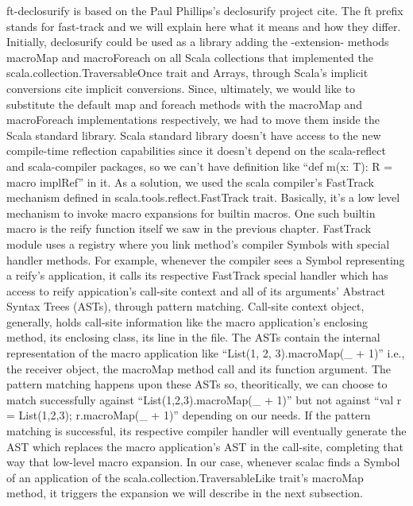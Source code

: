 ft-declosurify is based on the  Paul Phillips's declosurify project {cite}. The
ft prefix stands for fast-track and we will explain here what it
means and how they differ. Initially, declosurify could be used as a library
adding the -extension- methods macroMap and macroForeach on all Scala
collections that implemented the scala.collection.TraversableOnce trait and
Arrays, through Scala's implicit conversions {cite implicit conversions}. Since,
ultimately, we would like to substitute the default map and foreach methods
with the macroMap and macroForeach implementations respectively, we had to move
them inside the Scala standard library. Scala standard library
doesn't have access to the new compile-time reflection capabilities since it
doesn't depend on the
scala-reflect and scala-compiler packages, so we can't have definition like
``def m(x: T): R = macro implRef'' in it. As a solution, we
used the scala compiler's FastTrack mechanism defined in
scala.tools.reflect.FastTrack trait. Basically, it's a low level mechanism to
invoke macro expansions for builtin macros. One such builtin macro is the reify
function itself  we saw in
the previous chapter. FastTrack module uses a registry where you link
method's compiler Symbols with special handler methods. For example, whenever
the compiler sees a Symbol representing a reify's application, it calls its
respective FastTrack special handler which has access to reify appication's
call-site context and all of  its arguments' Abstract Syntax Trees (ASTs),
through pattern matching. Call-site context object, generally, holds call-site
information like the macro application's enclosing method, its enclosing class,
its line in the file. The ASTs contain the internal representation of the macro
application like ``List(1, 2, 3).macroMap(_ + 1)'' i.e., the receiver object,
the macroMap method call and its function argument. The pattern
matching happens upon these ASTs so, theoritically, we can choose to match
successfully against ``List(1,2,3).macroMap(_ + 1)'' but not against ``val r =
List(1,2,3); r.macroMap(_ + 1)'' depending on our needs. If the pattern matching
is successful, its respective compiler handler will eventually generate the AST
which replaces the macro application's AST in the call-site, completing that way
that low-level macro expansion. In our case, whenever scalac finds a Symbol of
an application of the scala.collection.TraversableLike trait's macroMap
method, it triggers the expansion we will describe in the next
subsection.

